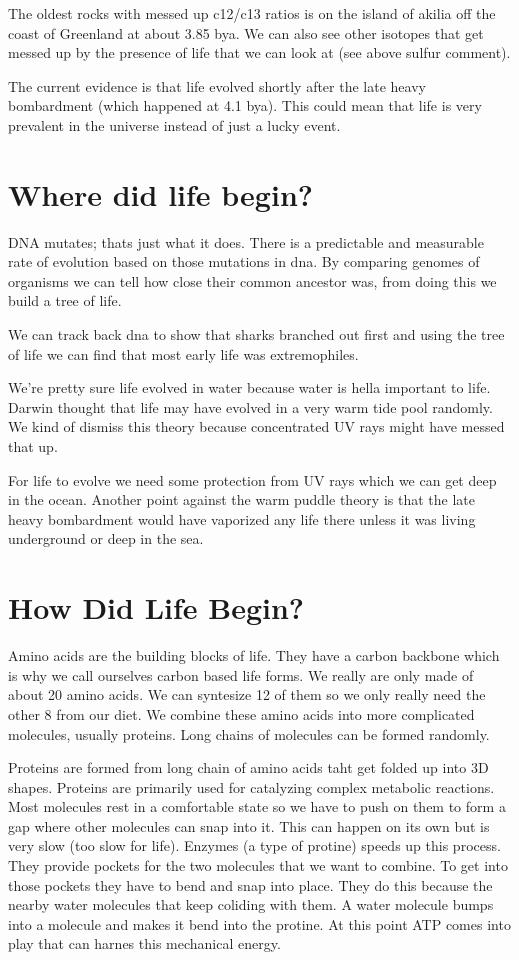 \documentclass{article}
\begin{document}
The oldest rocks with messed up c12/c13 ratios is on the island of akilia off the coast of Greenland at about 3.85 bya. We can also see other isotopes that get messed up by the presence of life that we can look at (see above sulfur comment).

The current evidence is that life evolved shortly after the late heavy bombardment (which happened at 4.1 bya). This could mean that life is very prevalent in the universe instead of just a lucky event.


\section*{Where did life begin?}
\label{sec:where_did_life_begin_}
DNA mutates; thats just what it does. There is a predictable and measurable rate of evolution based on those mutations in dna. By comparing genomes of organisms we can tell how close their common ancestor was, from doing this we build a tree of life.

We can track back dna to show that sharks branched out first and using the tree of life we can find that most early life was extremophiles.


We're pretty sure life evolved in water because water is hella important to life. Darwin thought that life may have evolved in a very warm tide pool randomly. We kind of dismiss this theory because concentrated UV rays might have messed that up.


For life to evolve we need some protection from UV rays which we can get deep in the ocean. Another point against the warm puddle theory is that the late heavy bombardment would have vaporized any life there unless it was living underground or deep in the sea.


\section*{How Did Life Begin?}
\label{sec:how_did_life_begin_}
Amino acids are the building blocks of life. They have a carbon backbone which is why we call ourselves carbon based life forms. We really are only made of about 20 amino acids. We can syntesize 12 of them so we only really need the other 8 from our diet. We combine these amino acids into more complicated molecules, usually proteins. Long chains of molecules can be formed randomly.


Proteins are formed from long chain of amino acids taht get folded up into 3D shapes. Proteins are primarily used for catalyzing complex metabolic reactions. Most molecules rest in a comfortable state so we have to push on them to form a gap where other molecules can snap into it. This can happen on its own but is very slow (too slow for life). Enzymes (a type of protine) speeds up this process. They provide pockets for the two molecules that we want to combine. To get into those pockets they have to bend and snap into place. They do this because the nearby water molecules that keep coliding with them. A water molecule bumps into a molecule and makes it bend into the protine. At this point ATP comes into play that can harnes this mechanical energy.
\end{document}

